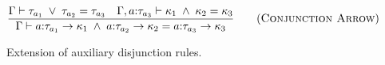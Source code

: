 \begin{figure}[h]
    \begin{equation}
        \frac{
            \Gamma \vdash \tau_{a_1} \;\lor\; \tau_{a_2} = \tau_{a_3} \quad \Gamma, a{:}\tau_{a_3} \vdash \kappa_1 \;\land\; \kappa_2 = \kappa_3
        }{
            \Gamma \vdash a{:}\tau_{a_1} \rightarrow \kappa_1 \;\land\; a{:}\tau_{a_2} \rightarrow \kappa_2 = a{:}\tau_{a_3} \rightarrow \kappa_3
        }
        \tag{\textsc{Conjunction Arrow}}
    \end{equation}
    \caption{Extension of auxiliary disjunction rules.}
    \label{fig:disjunction}
\end{figure}

\begin{comment}
    \begin{equation}
        \frac{
            \Gamma \vdash \tau_1 \;\lor\; \tau_2 = \tau_{12} \quad \Gamma \vdash \tau_{12} \;\lor\; \tau_3 \;\lor\; \dots \;\lor\; \tau_n = \tau
        }{
            \Gamma \vdash \tau_1 \;\lor\; \tau_2 \;\lor\; \tau_3 \;\lor\; \dots \;\lor\; \tau_n = \tau
        }
        \tag{\textsc{Multi-Disjunction}}
        \label{eq:multidisj}
    \end{equation}
\end{comment}

